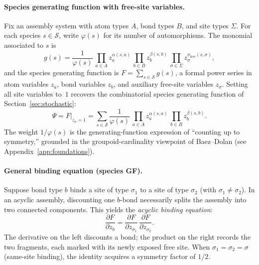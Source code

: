 \documentclass[11pt]{amsart}
\newcommand{\Species}{\mathcal{S}}
\newcommand{\GFspecies}{F}
\newcommand{\GFcomb}{\Psi}
\newcommand{\PDeriv}[2]{\frac{\partial #1}{\partial #2}}
\theoremstyle{definition}
\theoremstyle{plain}
\theoremstyle{remark}
\begin{document}
\paragraph{Species generating function with free-site variables.}
Fix an assembly system with atom types $A$, bond types $B$, and site types $\Sigma$.
For each species $s\in\Species$, write $\varphi(s)$ for its number of automorphisms.
The monomial associated to $s$ is
\begin{equation}\label{eq:species_monomial}
g(s) = \frac{1}{\varphi(s)}\,
\prod_{a\in A} z_a^{\alpha(s,a)}\,
\prod_{b\in B} z_b^{\beta(s,b)}\,
\prod_{\sigma\in\Sigma} z_\sigma^{\sigma_{\mathrm{free}}(s,\sigma)},
\end{equation}
and the species generating function is $\GFspecies = \sum_{s\in\Species} g(s)$, a formal power series in atom variables $z_a$, bond variables $z_b$, and auxiliary free-site variables $z_\sigma$.
Setting all site variables to~$1$ recovers the combinatorial species generating function of Section~\ref{sec:stochastic}:
\[
\GFcomb = \GFspecies\big|_{z_\sigma=1}
= \sum_{s\in\Species}\frac{1}{\varphi(s)}\,
\prod_{a\in A} z_a^{\alpha(s,a)}\,
\prod_{b\in B} z_b^{\beta(s,b)}.
\]
The weight $1/\varphi(s)$ is the generating-function expression of ``counting up to symmetry,'' grounded in the groupoid-cardinality viewpoint of Baez--Dolan \cite{baez2001finite} (see Appendix~\ref{app:foundations}).

\paragraph{General binding equation (species GF).}
Suppose bond type $b$ binds a site of type $\sigma_1$ to a site of type $\sigma_2$ (with $\sigma_1\neq\sigma_2$).
In an acyclic assembly, discounting one $b$-bond necessarily splits the assembly into two connected components.
This yields the \emph{acyclic binding equation}:
\begin{equation}\label{eq:general_binding_eq_species}
\PDeriv{\GFspecies}{z_b} = \PDeriv{\GFspecies}{z_{\sigma_1}}\,\PDeriv{\GFspecies}{z_{\sigma_2}}.
\end{equation}
The derivative on the left discounts a bond; the product on the right records the two fragments, each marked with its newly exposed free site.
When $\sigma_1=\sigma_2=\sigma$ (same-site binding), the identity acquires a symmetry factor of $1/2$.
\end{document}
